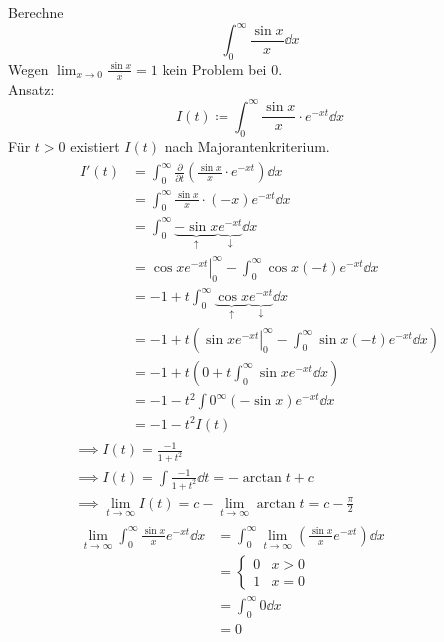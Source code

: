 \begin{bsp}
	Berechne
	\[ \int_0^\infty \frac{\sin x}{x} \dd x \]
	Wegen $\lim_{x \rightarrow 0} \frac{\sin x}{x} = 1$ kein Problem bei $0$. \\
	Ansatz:
	\[ I(t) \coloneqq \int_0^\infty \frac{\sin x}{x} \cdot e^{-xt} \dd x \]
	Für $t > 0$ existiert $I(t)$ nach Majorantenkriterium.
	\begin{gather*}
		\begin{split}
			I'(t)
				&= \int_0^\infty \frac{\partial}{\partial t} \left( \frac{\sin x}{x} \cdot e^{-xt} \right) \dd x \\
				&= \int_0^\infty \frac{\sin x}{x} \cdot(-x) e^{-xt} \dd x \\
				&= \int_0^\infty \underbrace{-\sin x}_{\uparrow} \underbrace{e^{-xt}}_{\downarrow} \dd x \\
				&= \left. \cos x e^{-xt} \right|_0^\infty - \int_0^\infty \cos x (-t) e^{-xt} \dd x \\
				&= -1 + t \int_0^\infty \underbrace{\cos x}_{\uparrow} \underbrace{e^{-xt}}_{\downarrow} \dd x \\
				&= -1 + t \left( \left. \sin x e^{-xt}\right|_0^\infty - \int_0^\infty \sin x (-t) e^{-xt} \dd x \right) \\
				&= -1 + t \left( 0 + t \int_0^\infty \sin x e^{-xt} \dd x \right) \\
				&= -1 - t^2 \int0^\infty (-\sin x) e^{-xt} \dd x \\
				&= -1 -t^2 I(t)
		\end{split} \\
		\implies I(t) = \frac{-1}{1+t^2} \\
		\implies I(t) = \int \frac{-1}{1+t^2} \dd t = -\arctan t + c \\
		\implies \lim_{t \rightarrow \infty} I(t) = c - \lim_{t \rightarrow \infty} \arctan t = c - \frac{\pi}{2} \\
		\begin{split}
			\lim_{t \rightarrow \infty} \int_0^\infty \frac{\sin x}{x} e^{-xt} \dd x
				&= \int_0^\infty \lim_{t \rightarrow \infty} \left( \frac{\sin x}{x} e^{-xt} \right) \dd x \\
				&= \begin{cases}
					0	&x > 0	\\
					1	&x = 0	
				\end{cases} \\
				&= \int_0^\infty 0 \dd x \\
				&= 0
		\end{split} \\

\end{gather*}
\end{bsp}
